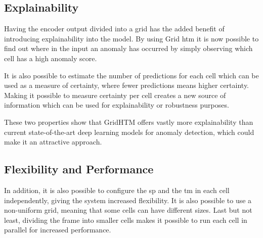 \subsection{Explainability}
Having the encoder output divided into a grid has the added benefit of introducing explainability into the model. By using Grid \gls*{htm} it is now possible to find out where in the input an anomaly has occurred by simply observing which cell has a high anomaly score.
\par
It is also possible to estimate the number of predictions for each cell which can be used as a measure of certainty, where fewer predictions means higher certainty. Making it possible to measure certainty per cell creates a new source of information which can be used for explainability or robustness purposes.
\par
These two properties show that GridHTM offers vastly more explainability than current state-of-the-art deep learning models for anomaly detection, which could make it an attractive approach.
\subsection{Flexibility and Performance}
In addition, it is also possible to configure the \gls*{sp} and the \gls*{tm} in each cell independently, giving the system increased flexibility. It is also possible to use a non-uniform grid, meaning that some cells can have different sizes. Last but not least, dividing the frame into smaller cells makes it possible to run each cell in parallel for increased performance.
